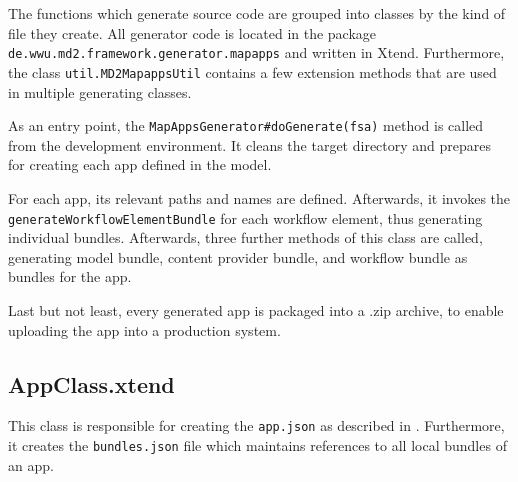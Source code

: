 
The functions which generate \mapapps source code are grouped into classes by the kind of file they create. All \mapapps generator code is located in the package \lstinline[language=Simple]|de.wwu.md2.framework.generator.mapapps| and written in Xtend. Furthermore, the class \lstinline|util.MD2MapappsUtil| contains a few extension methods that are used in multiple generating classes.

As an entry point, the \lstinline[language=Simple]|MapAppsGenerator#doGenerate(fsa)| method is called from the development environment. It cleans the target directory and prepares for creating  each app defined in the model.

For each app, its relevant paths and names are defined. Afterwards, it invokes the \lstinline|generateWorkflowElementBundle| for each workflow element, thus generating individual bundles. Afterwards, three further methods of this class are called, generating model bundle, content provider bundle, and workflow bundle as bundles for the app.


Last but not least, every generated app is packaged into a .zip archive, to enable uploading the app into a production \mapapps system.

\subsection{AppClass.xtend}

This class is responsible for creating the \lstinline[language=Simple]|app.json| as described in . Furthermore, it creates the \lstinline[language=Simple]|bundles.json| file which maintains references to all local bundles of an app.

